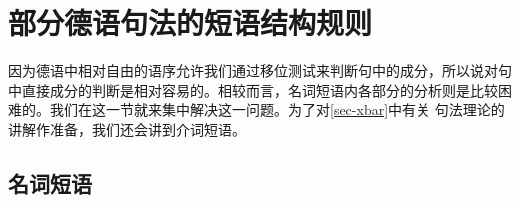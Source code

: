 \section{部分德语句法的短语结构规则}

因为德语中相对自由的语序允许我们通过移位测试来判断句中的成分，所以说对句中直接成分的判断是相对容易的。相较而言，名词短语内各部分的分析则是比较困难的。我们在这一节就来集中解决这一问题。为了对\ref{sec-xbar}中有关 \xbar 句法理论的讲解作准备，我们还会讲到介词短语。

\subsection{名词短语}
\label{sec-psg-np}

